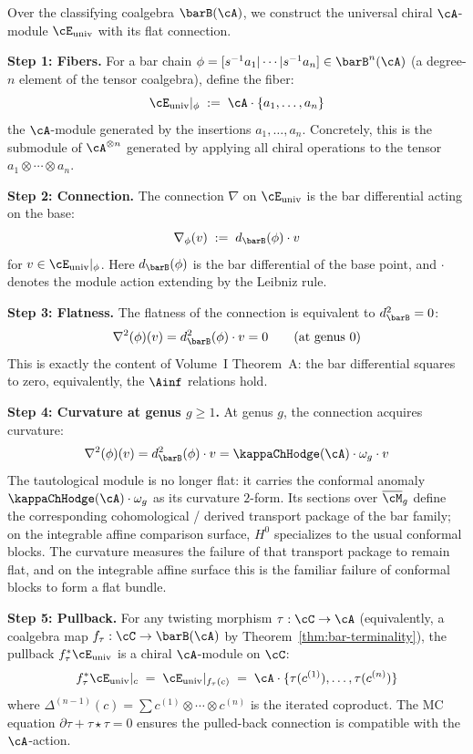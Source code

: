 \begin{construction}
\label{constr:tautological-bundle}

Over the classifying coalgebra $\barB(\cA)$, we construct the universal chiral $\cA$-module $\cE_{\mathrm{univ}}$ with its flat connection.

\textbf{Step 1: Fibers.} For a bar chain $\phi = [s^{-1}a_1 | \cdots | s^{-1}a_n] \in \barB^n(\cA)$ (a degree-$n$ element of the tensor coalgebra), define the fiber:
$$\cE_{\mathrm{univ}}|_\phi \;:=\; \cA \cdot \{a_1, \ldots, a_n\}$$
the $\cA$-module generated by the insertions $a_1, \ldots, a_n$. Concretely, this is the submodule of $\cA^{\otimes n}$ generated by applying all chiral operations to the tensor $a_1 \otimes \cdots \otimes a_n$.

\textbf{Step 2: Connection.} The connection $\nabla$ on $\cE_{\mathrm{univ}}$ is the bar differential acting on the base:
$$\nabla_\phi(v) \;:=\; d_{\barB}(\phi) \cdot v$$
for $v \in \cE_{\mathrm{univ}}|_\phi$. Here $d_{\barB}(\phi)$ is the bar differential of the base point, and $\cdot$ denotes the module action extending by the Leibniz rule.

\textbf{Step 3: Flatness.} The flatness of the connection is equivalent to $d_{\barB}^2 = 0$:
$$\nabla^2(\phi)(v) = d_{\barB}^2(\phi) \cdot v = 0 \qquad \text{(at genus 0)}$$
This is exactly the content of Volume~I Theorem~A: the bar differential squares to zero, equivalently, the $\Ainf$ relations hold.

\textbf{Step 4: Curvature at genus $g \geq 1$.} At genus $g$, the connection acquires curvature:
$$\nabla^2(\phi)(v) = d_{\barB}^2(\phi) \cdot v = \kappaChHodge(\cA) \cdot \omega_g \cdot v$$
The tautological module is no longer flat: it carries the conformal anomaly $\kappaChHodge(\cA) \cdot \omega_g$ as its curvature $2$-form. Its sections over $\overline{\cM}_g$ define the corresponding cohomological / derived transport package of the bar family; on the integrable affine comparison surface, $H^0$ specializes to the usual conformal blocks. The curvature measures the failure of that transport package to remain flat, and on the integrable affine surface this is the familiar failure of conformal blocks to form a flat bundle.

\textbf{Step 5: Pullback.} For any twisting morphism $\tau: \cC \to \cA$ (equivalently, a coalgebra map $f_\tau: \cC \to \barB(\cA)$ by Theorem~\ref{thm:bar-terminality}), the pullback $f_\tau^* \cE_{\mathrm{univ}}$ is a chiral $\cA$-module on $\cC$:
$$f_\tau^* \cE_{\mathrm{univ}}|_c \;=\; \cE_{\mathrm{univ}}|_{f_\tau(c)} \;=\; \cA \cdot \{\tau(c^{(1)}), \ldots, \tau(c^{(n)})\}$$
where $\Delta^{(n-1)}(c) = \sum c^{(1)} \otimes \cdots \otimes c^{(n)}$ is the iterated coproduct. The MC equation $\partial\tau + \tau \star \tau = 0$ ensures the pulled-back connection is compatible with the $\cA$-action.
\end{construction}

